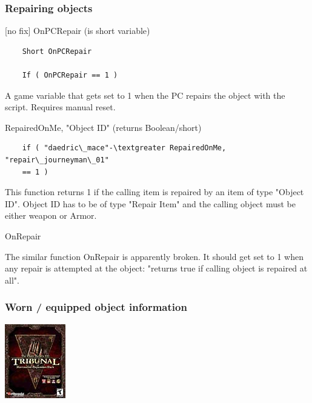 \hypertarget{section-1}{%
\subsubsection{}\label{section-1}}

\hypertarget{repairing-objects}{%
\subsubsection{Repairing objects}\label{repairing-objects}}

	{[}no fix{]} OnPCRepair (is short variable)

\begin{lstlisting}	
	Short OnPCRepair
	
	If ( OnPCRepair == 1 )
\end{lstlisting}

A game variable that gets set to 1 when the PC repairs the object with
the script. Requires manual reset.

	RepairedOnMe, "Object ID" (returns Boolean/short)

\begin{lstlisting}	
	if ( "daedric\_mace"-\textgreater RepairedOnMe, "repair\_journeyman\_01"
	== 1 )
\end{lstlisting}

This function returns 1 if the calling item is repaired by an item of
type "Object ID". Object ID has to be of type "Repair Item" and the
calling object must be either weapon or Armor.

OnRepair

The similar function OnRepair is apparently broken. It should get set to
1 when any repair is attempted at the object: "returns true if calling
object is repaired at all".

\hypertarget{worn-equipped-object-information}{%
\subsubsection{Worn / equipped object
information}\label{worn-equipped-object-information}}

\includegraphics{media/image6.png}

